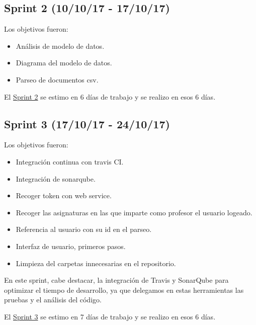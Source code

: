 
\subsection{Sprint 2 (10/10/17 -
	17/10/17)}\label{sprint-2-101017---171017}

Los objetivos fueron:
\begin{itemize}
	\tightlist
	\item
	Análisis de modelo de datos.
	\item
	Diagrama del modelo de datos.
	\item
	Parseo de documentos csv.	
	
\end{itemize}

El \href{https://github.com/trona85/GII-17.1B-UBULog-1.0/milestone/2?closed=1}{Sprint 2} se estimo en 6 días de trabajo y se realizo en esos 6 días.


\subsection{Sprint 3 (17/10/17 -
	24/10/17)}\label{sprint-3-171017---241017}

Los objetivos fueron:
\begin{itemize}
	\tightlist
	\item
	Integración continua con travis CI.
	\item
	Integración de  sonarqube.
	\item
	Recoger token con web service.	
	\item
	Recoger las asignaturas en las que imparte como profesor el usuario logeado.
	\item
	Referencia al usuario con su id en el parseo.
	\item
	Interfaz de usuario, primeros pasos.
	\item
	Limpieza del carpetas innecesarias en el repositorio.
	
\end{itemize}

En este sprint, cabe destacar, la integración de Travis\cite{web:travis} y SonarQube \cite{web:sonarqube} para optimizar el tiempo de desarrollo, ya que delegamos en estas herramientas las pruebas y el análisis del código.

El \href{https://github.com/trona85/GII-17.1B-UBULog-1.0/milestone/3?closed=1}{Sprint 3} se estimo en 7 días de trabajo y se realizo en esos 6 días.

